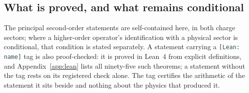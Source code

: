 \documentclass[11pt]{article}
\theoremstyle{plain}
\theoremstyle{definition}
\theoremstyle{remark}
\newcommand{\leanref}[1]{{\footnotesize\textcolor{DarkSlateGray}{\texttt{[Lean: #1]}}}}
\begin{document}
\subsection*{What is proved, and what remains conditional}

The principal second-order statements are self-contained here, in both
charge sectors; where a higher-order operator's identification with a
physical sector is conditional, that condition is stated separately. A
statement carrying a \leanref{name} tag is also proof-checked: it is proved
in Lean~4 from explicit definitions, and Appendix~\ref{app:lean} lists all
ninety-five such theorems; a statement without the tag rests on its
registered check alone. The tag certifies the arithmetic of the statement it
sits beside and nothing about the physics that produced it.
\end{document}
